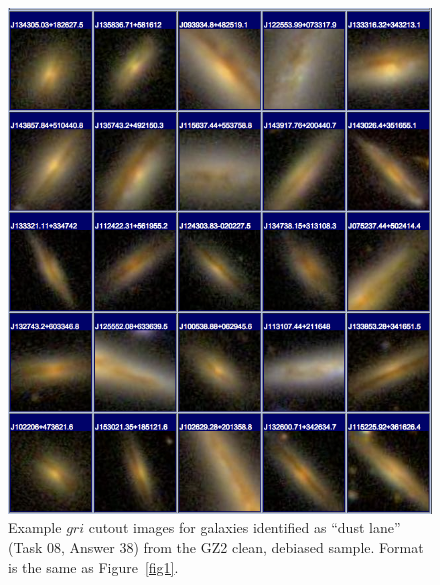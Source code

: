 \documentclass[useAMS,usenatbib]{mn2e}
\begin{document}
\newpage
\clearpage
\begin{figure}
\includegraphics[angle=0,width=7.0in]{figures/gallery/dustlane.png}
\caption{Example $gri$ cutout images for galaxies identified as ``dust lane'' (Task 08, Answer 38) from the GZ2 clean, debiased sample. Format is the same as Figure~\ref{fig1}.}
\end{figure}
\end{document}
